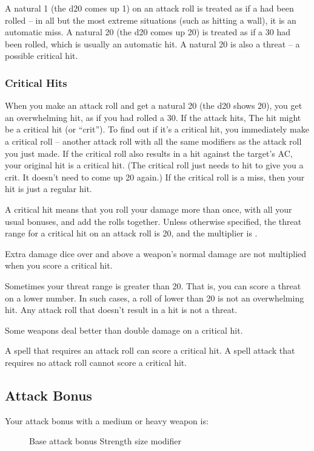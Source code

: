  A natural 1 (the d20 comes up 1) on an attack roll is treated as if a  had been rolled --  in all but the most extreme situations (such as hitting a wall), it is an automatic miss. A natural 20 (the d20 comes up 20) is treated as if a 30 had been rolled, which is usually an automatic hit. A natural 20 is also a threat -- a possible critical hit.

\subsubsection{Critical Hits}
When you make an attack roll and get a natural 20 (the d20 shows 20), you get an overwhelming hit, as if you had rolled a 30. If the attack hits, The hit might be a critical hit (or ``crit''). To find out if it's a critical hit, you immediately make a critical roll -- another attack roll with all the same modifiers as the attack roll you just made. If the critical roll also results in a hit against the target's AC, your original hit is a critical hit. (The critical roll just needs to hit to give you a crit. It doesn't need to come up 20 again.) If the critical roll is a miss, then your hit is just a regular hit.

A critical hit means that you roll your damage more than once, with all your usual bonuses, and add the rolls together. Unless otherwise specified, the threat range for a critical hit on an attack roll is 20, and the multiplier is .

 Extra damage dice over and above a weapon's normal damage are not multiplied when you score a critical hit.

 Sometimes your threat range is greater than 20. That is, you can score a threat on a lower number. In such cases, a roll of lower than 20 is not an overwhelming hit. Any attack roll that doesn't result in a hit is not a threat.

 Some weapons deal better than double damage on a critical hit.

 A spell that requires an attack roll can score a critical hit. A spell attack that requires no attack roll cannot score a critical hit.

\subsection{Attack Bonus}
Your attack bonus with a medium or heavy weapon is:
\begin{figure}[h]
\centering Base attack bonus \add Strength \add size modifier
\end{figure}

